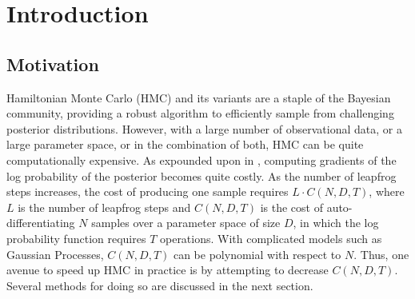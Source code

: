 \documentclass{article}
\theoremstyle{plain}
\theoremstyle{definition}
\theoremstyle{remark}
\begin{document}
\begin{abstract}
The advent of automatic differentiation \cite{baydin2018automatic} has allowed gradient based MCMC methods to prosper. For example, Hamiltonian Monte Carlo \cite{Brooks_2011} (HMC) has been the workhorse of Bayesian inferential methods, allowing for efficient sampling from high dimensional posterior distributions. Advancements including the No U-Turn Sampler \cite{hoffman2011nouturn} (NUTS) as well as Riemannian Manifold Hamiltonian Monte Carlo \cite{Betancourt_2013} (RMHMC) further improved the efficiency of the standard sampling algorithm. Because gradient calculations can be computationally expensive, ``surrogate" HMC methods were developed; these methods aim to learn an approximation of a computationally complex aspect of HMC during the burn-in phase, and apply the approximation during the sampling phase in order to speed up the algorithm. Recent advancements in neural network architecture such as the development of Hamiltonian Neural Networks \cite{greydanus2019hamiltonian} (HNNs) and Neural ODEs \cite{chen2019neural} offer a natural architectural extension of these ``surrogate" methods, and allow for the explicit preservation of Hamiltonian qualities. We show several possible architectural extensions to surrogate methods using these recent advancements, and illustrate their utility as compared to baseline surrogate models. 

\end{abstract}


\section{Introduction}
\label{introduction}
\subsection{Motivation}
Hamiltonian Monte Carlo (HMC) and its variants are a staple of the Bayesian community, providing a robust algorithm to efficiently sample from challenging posterior distributions. However, with a large number of observational data, or a large parameter space, or in the combination of both, HMC can be quite computationally expensive. As expounded upon in , computing gradients of the log probability of the posterior becomes quite costly. As the number of leapfrog steps increases, the cost of producing one sample requires $L \cdot C(N, D, T)$, where $L$ is the number of leapfrog steps and $C(N, D, T)$ is the cost of auto-differentiating $N$ samples over a parameter space of size  $D$, in which the log probability function requires $T$ operations. With complicated models such as Gaussian Processes, $C(N, D, T)$ can be polynomial with respect to $N$. Thus, one avenue to speed up HMC in practice is by attempting to decrease $C(N, D, T)$. Several methods for doing so are discussed in the next section.
\end{document}
